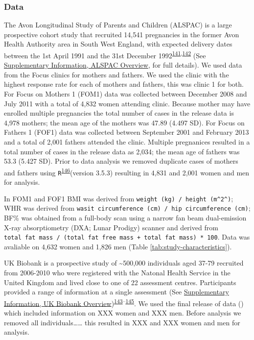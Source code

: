 \documentclass[11pt,twoside]{bristolthesis}
\begin{document}
\hypertarget{data}{%
\subsubsection{Data}\label{data}}

The Avon Longitudinal Study of Parents and Children (ALSPAC) is a large prospective cohort study that recruited 14,541 pregnancies in the former Avon Health Authority area in South West England, with expected delivery dates between the 1st April 1991 and the 31st December 1992\textsuperscript{\protect\hyperlink{ref-Fraser2013}{141},\protect\hyperlink{ref-Boyd2013}{142}} (See \protect\hyperlink{supp-alspac}{Supplementary Information, ALSPAC Overview}, for full details). We used data from the Focus clinics for mothers and fathers. We used the clinic with the highest response rate for each of mothers and fathers, this was clinic 1 for both. For Focus on Mothers 1 (FOM1) data was collected between December 2008 and July 2011 with a total of 4,832 women attending clinic. Because mother may have enrolled multiple pregnancies the total number of cases in the release data is 4,978 mothers; the mean age of the mothers was 47.89 (4.497 SD). For Focus on Fathers 1 (FOF1) data was collected between September 2001 and February 2013 and a total of 2,001 fathers attended the clinic. Multiple pregnanices resulted in a total number of cases in the release data as 2,034; the mean age of fathers was 53.3 (5.427 SD). Prior to data analysis we removed duplicate cases of mothers and fathers using \texttt{R}\textsuperscript{\protect\hyperlink{ref-r2019}{146}}(version 3.5.3) resulting in 4,831 and 2,001 women and men for analysis.

In FOM1 and FOF1 BMI was derived from \texttt{weight\ (kg)\ /\ height\ (m\^{}2\^{})}; WHR was derived from \texttt{wasit\ circumference\ (cm)\ /\ hip\ circumference\ (cm)}; BF\% was obtained from a full-body scan using a narrow fan beam dual-emission X-ray absorptiometry (DXA; Lunar Prodigy) scanner and derived from \texttt{total\ fat\ mass\ /\ (total\ fat\ free\ mass\ +\ total\ fat\ mass)\ *\ 100}. Data was avaliable on 4,632 women and 1,826 men (Table \ref{tab:study-characteristics}).

UK Biobank is a prospective study of \textasciitilde{}500,000 individuals aged 37-79 recruited from 2006-2010 who were registered with the Natonal Health Service in the United Kingdom and lived close to one of 22 assessment centres. Participants provided a range of information at a single assessment (See \protect\hyperlink{supp-biobank}{Supplementary Information, UK Biobank Overview})\textsuperscript{\protect\hyperlink{ref-Collins2012}{143}--\protect\hyperlink{ref-Sudlow2015}{145}}. We used the final release of data () which included information on XXX women and XXX men. Before analysis we removed all individuals\ldots{}\ldots{} this resulted in XXX and XXX women and men for analysis.
\end{document}
